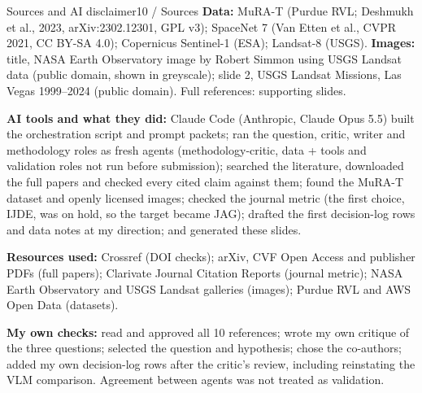 \documentclass[aspectratio=169,11pt]{beamer}
\newcommand{\graticule}{%
  \foreach \x in {0,1.6,...,16.4} \draw[white,opacity=0.06,line width=0.4pt] ([xshift=\x cm]current page.south west) -- ([xshift=\x cm]current page.north west);
  \foreach \y in {0,1.6,...,9.6} \draw[white,opacity=0.06,line width=0.4pt] ([yshift=\y cm]current page.south west) -- ([yshift=\y cm]current page.south east);}
\begin{document}
\begin{frame}[shrink=18]{Sources and AI disclaimer}{10 / Sources}
\footnotesize
\textbf{Data:} MuRA-T (Purdue RVL; Deshmukh et al., 2023, arXiv:2302.12301, GPL v3); SpaceNet 7 (Van Etten et al., CVPR 2021, CC BY-SA 4.0); Copernicus Sentinel-1 (ESA); Landsat-8 (USGS). \textbf{Images:} title, NASA Earth Observatory image by Robert Simmon using USGS Landsat data (public domain, shown in greyscale); slide 2, USGS Landsat Missions, Las Vegas 1999--2024 (public domain). Full references: supporting slides.

\vspace{6pt}
\textbf{AI tools and what they did:} Claude Code (Anthropic, Claude Opus 5.5) built the orchestration script and prompt packets; ran the question, critic, writer and methodology roles as fresh agents (methodology-critic, data + tools and validation roles not run before submission); searched the literature, downloaded the full papers and checked every cited claim against them; found the MuRA-T dataset and openly licensed images; checked the journal metric (the first choice, IJDE, was on hold, so the target became JAG); drafted the first decision-log rows and data notes at my direction; and generated these slides.

\vspace{4pt}
\textbf{Resources used:} Crossref (DOI checks); arXiv, CVF Open Access and publisher PDFs (full papers); Clarivate Journal Citation Reports (journal metric); NASA Earth Observatory and USGS Landsat galleries (images); Purdue RVL and AWS Open Data (datasets).

\vspace{6pt}
\textbf{My own checks:} read and approved all 10 references; wrote my own critique of the three questions; selected the question and hypothesis; chose the co-authors; added my own decision-log rows after the critic's review, including reinstating the VLM comparison. Agreement between agents was not treated as validation.
\end{frame}

\begin{frame}[plain]
\end{frame}
\end{document}
